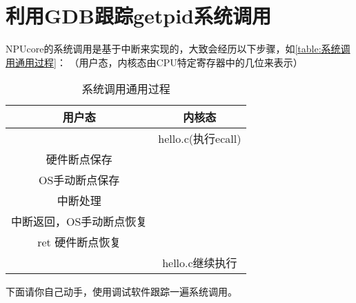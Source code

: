 \section{利用GDB跟踪getpid系统调用}

NPUcore的系统调用是基于中断来实现的，大致会经历以下步骤，如\autoref{table:系统调用通用过程}：
（用户态，内核态由CPU特定寄存器中的几位来表示）

\begin{table}[h]
    \centering
    \caption{系统调用通用过程}
    \label{table:系统调用通用过程}
    \begin{tabular}{|c|c|}
        \hline
        \textbf{用户态}  & \textbf{内核态}     \\\hline
                        & hello.c(执行ecall) \\\hline
        硬件断点保存     &                    \\\hline
        OS手动断点保存   &                    \\\hline
        中断处理         &                    \\\hline
        中断返回，OS手动断点恢复 &                \\\hline
        ret 硬件断点恢复 &                    \\\hline
                        & hello.c继续执行     \\\hline
    \end{tabular}
\end{table}

下面请你自己动手，使用调试软件跟踪一遍系统调用。